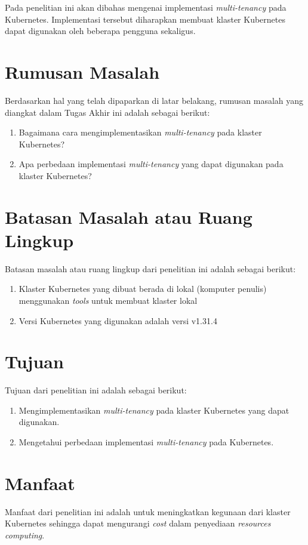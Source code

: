 Pada penelitian ini akan dibahas mengenai implementasi \emph{multi-tenancy}
pada Kubernetes. Implementasi tersebut diharapkan membuat klaster
Kubernetes dapat digunakan oleh beberapa pengguna sekaligus.

\section{Rumusan Masalah}

Berdasarkan hal yang telah dipaparkan di latar belakang, rumusan masalah
yang diangkat dalam Tugas Akhir ini adalah sebagai berikut:
\begin{enumerate}[itemsep=-0.2cm, topsep=-0.3cm]
  \item{Bagaimana cara mengimplementasikan \emph{multi-tenancy} pada klaster Kubernetes?}
  \item{Apa perbedaan implementasi \emph{multi-tenancy} yang dapat digunakan pada klaster Kubernetes?}
\end{enumerate}

\section{Batasan Masalah atau Ruang Lingkup}

Batasan masalah atau ruang lingkup dari penelitian ini adalah sebagai berikut:
\begin{enumerate}[itemsep=-0.2cm, topsep=-0.3cm]
  \item{Klaster Kubernetes yang dibuat berada di lokal (komputer penulis) menggunakan \emph{tools} untuk membuat klaster lokal}
  \item{Versi Kubernetes yang digunakan adalah versi v1.31.4}
\end{enumerate}

\section{Tujuan}

Tujuan dari penelitian ini adalah sebagai berikut:
\begin{enumerate}[itemsep=-0.2cm, topsep=-0.3cm]
  \item{Mengimplementasikan \emph{multi-tenancy} pada klaster Kubernetes yang dapat digunakan.}
  \item{Mengetahui perbedaan implementasi \emph{multi-tenancy} pada Kubernetes.}
\end{enumerate}

\section{Manfaat}

Manfaat dari penelitian ini adalah untuk meningkatkan kegunaan dari
klaster Kubernetes sehingga dapat mengurangi \emph{cost} dalam penyediaan
\emph{resources computing}.
